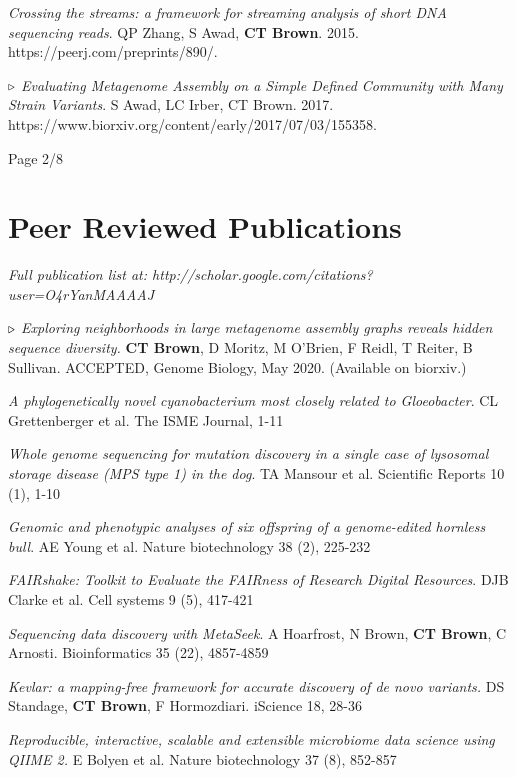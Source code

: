 \documentclass[margin,line]{resume}
\begin{document}
\begin{resume}
{\em Crossing the streams: a framework for streaming analysis of short DNA sequencing reads}. QP Zhang, S Awad, {\bf CT Brown}. 2015. https://peerj.com/preprints/890/.

{\color{red} ${\bf \triangleright}$}
{\em Evaluating Metagenome Assembly on a Simple Defined Community with Many Strain Variants}. S Awad, LC Irber, CT Brown. 2017. https://www.biorxiv.org/content/early/2017/07/03/155358.

\vspace{1cm}
{\centerline {Page 2/8}}

\newpage

\section{\mysidestyle Peer Reviewed Publications}

{\em Full publication list at: http://scholar.google.com/citations?user=O4rYanMAAAAJ}

{\color{red} ${\bf \triangleright}$}
{\em Exploring neighborhoods in large metagenome assembly graphs reveals hidden sequence diversity.} {\bf CT Brown}, D Moritz, M O'Brien, F Reidl, T Reiter, B Sullivan. ACCEPTED, Genome Biology, May 2020. (Available on biorxiv.)

{\em A phylogenetically novel cyanobacterium most closely related to Gloeobacter}. CL Grettenberger et al.
The ISME Journal, 1-11

{\em Whole genome sequencing for mutation discovery in a single case of lysosomal storage disease (MPS type 1) in the dog}. TA Mansour et al. 
Scientific Reports 10 (1), 1-10

{\em Genomic and phenotypic analyses of six offspring of a genome-edited hornless bull}. AE Young et al. Nature biotechnology 38 (2), 225-232

{\em FAIRshake: Toolkit to Evaluate the FAIRness of Research Digital Resources}. DJB Clarke et al.
Cell systems 9 (5), 417-421

{\em Sequencing data discovery with MetaSeek}. A Hoarfrost, N Brown, {\bf CT Brown}, C Arnosti. Bioinformatics 35 (22), 4857-4859

{\em Kevlar: a mapping-free framework for accurate discovery of de novo variants.} DS Standage, {\bf CT Brown}, F Hormozdiari. iScience 18, 28-36

{\em Reproducible, interactive, scalable and extensible microbiome data science using QIIME 2.} E Bolyen et al.
Nature biotechnology 37 (8), 852-857


\end{resume}
\end{document}
